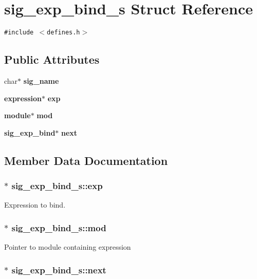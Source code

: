 \section{sig\_\-exp\_\-bind\_\-s  Struct Reference}
\label{structsig__exp__bind__s}
{\tt \#include $<$defines.h$>$}

\subsection*{Public Attributes}
\begin{CompactItemize}
\item 
char$\ast$ {\bf sig\_\-name}
\item 
{\bf expression}$\ast$ {\bf exp}
\item 
{\bf module}$\ast$ {\bf mod}
\item 
{\bf sig\_\-exp\_\-bind}$\ast$ {\bf next}
\end{CompactItemize}


\subsection{Member Data Documentation}
\subsubsection{ $\ast$ sig\_\-exp\_\-bind\_\-s::exp}\label{structsig__exp__bind__s_m1}


Expression to bind. 
\subsubsection{ $\ast$ sig\_\-exp\_\-bind\_\-s::mod}\label{structsig__exp__bind__s_m2}


Pointer to module containing expression 
\subsubsection{ $\ast$ sig\_\-exp\_\-bind\_\-s::next}\label{structsig__exp__bind__s_m3}


